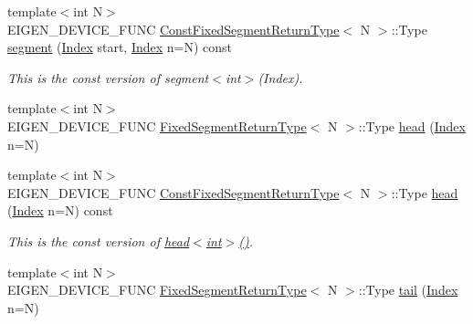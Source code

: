 \begin{DoxyCompactItemize}
\item 
\mbox{\label{class_eigen_1_1_sparse_matrix_base_a7acc88755710b97fc89ff3293787d55d}} 
{\footnotesize template$<$int N$>$ }\\E\+I\+G\+E\+N\+\_\+\+D\+E\+V\+I\+C\+E\+\_\+\+F\+U\+NC \mbox{\hyperlink{struct_eigen_1_1_sparse_matrix_base_1_1_const_fixed_segment_return_type}{Const\+Fixed\+Segment\+Return\+Type}}$<$ N $>$\+::Type \mbox{\hyperlink{class_eigen_1_1_sparse_matrix_base_a7acc88755710b97fc89ff3293787d55d}{segment}} (\mbox{\hyperlink{struct_eigen_1_1_eigen_base_a554f30542cc2316add4b1ea0a492ff02}{Index}} start, \mbox{\hyperlink{struct_eigen_1_1_eigen_base_a554f30542cc2316add4b1ea0a492ff02}{Index}} n=N) const
\begin{DoxyCompactList}\small\item\em This is the const version of segment$<$int$>$(\+Index). \end{DoxyCompactList}\item 
{\footnotesize template$<$int N$>$ }\\E\+I\+G\+E\+N\+\_\+\+D\+E\+V\+I\+C\+E\+\_\+\+F\+U\+NC \mbox{\hyperlink{struct_eigen_1_1_sparse_matrix_base_1_1_fixed_segment_return_type}{Fixed\+Segment\+Return\+Type}}$<$ N $>$\+::Type \mbox{\hyperlink{class_eigen_1_1_sparse_matrix_base_a29ab4aa54c376d9166252d545f98d3cd}{head}} (\mbox{\hyperlink{struct_eigen_1_1_eigen_base_a554f30542cc2316add4b1ea0a492ff02}{Index}} n=N)
\item 
\mbox{\label{class_eigen_1_1_sparse_matrix_base_a06c480ce669082944383471dbc079d47}} 
{\footnotesize template$<$int N$>$ }\\E\+I\+G\+E\+N\+\_\+\+D\+E\+V\+I\+C\+E\+\_\+\+F\+U\+NC \mbox{\hyperlink{struct_eigen_1_1_sparse_matrix_base_1_1_const_fixed_segment_return_type}{Const\+Fixed\+Segment\+Return\+Type}}$<$ N $>$\+::Type \mbox{\hyperlink{class_eigen_1_1_sparse_matrix_base_a06c480ce669082944383471dbc079d47}{head}} (\mbox{\hyperlink{struct_eigen_1_1_eigen_base_a554f30542cc2316add4b1ea0a492ff02}{Index}} n=N) const
\begin{DoxyCompactList}\small\item\em This is the const version of \mbox{\hyperlink{class_eigen_1_1_sparse_matrix_base_a6b3f24af4a70e2824a52fbe909872274}{head$<$int$>$()}}. \end{DoxyCompactList}\item 
{\footnotesize template$<$int N$>$ }\\E\+I\+G\+E\+N\+\_\+\+D\+E\+V\+I\+C\+E\+\_\+\+F\+U\+NC \mbox{\hyperlink{struct_eigen_1_1_sparse_matrix_base_1_1_fixed_segment_return_type}{Fixed\+Segment\+Return\+Type}}$<$ N $>$\+::Type \mbox{\hyperlink{class_eigen_1_1_sparse_matrix_base_a4c210c4ddf80da455aaec0ab31093737}{tail}} (\mbox{\hyperlink{struct_eigen_1_1_eigen_base_a554f30542cc2316add4b1ea0a492ff02}{Index}} n=N)

\end{DoxyCompactItemize}
